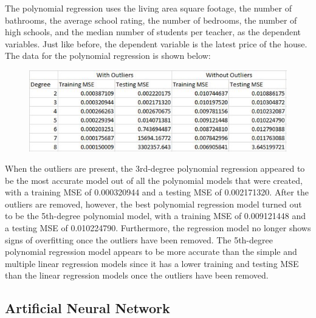 \documentclass[12pt]{article}
\begin{document}
	The polynomial regression uses the living area square footage, the number of bathrooms, the average school rating, the number of bedrooms, the number of high schools, and the median number of students per teacher, as the dependent variables. Just like before, the dependent variable is the latest price of the house. The data for the polynomial regression is shown below:
	
	\begin{figure}[H]
		\label{fig:fig4}
		\includegraphics[width=1\linewidth]{fig4}
	\end{figure}
	
	When the outliers are present, the 3rd-degree polynomial regression appeared to be the most accurate model out of all the polynomial models that were created, with a training MSE of 0.000320944 and a testing MSE of 0.002171320. After the outliers are removed, however, the best polynomial regression model turned out to be the 5th-degree polynomial model, with a training MSE of 0.009121448 and a testing MSE of 0.010224790. Furthermore, the regression model no longer shows signs of overfitting once the outliers have been removed. The 5th-degree polynomial regression model appears to be more accurate than the simple and multiple linear regression models since it has a lower training and testing MSE than the linear regression models once the outliers have been removed.
	
	
	\subsection{Artificial Neural Network}
	
\end{document}
